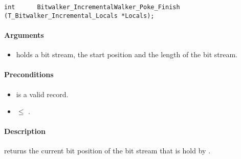 \begin{lstlisting}[style=acsl-block]
int		 Bitwalker_IncrementalWalker_Poke_Finish (T_Bitwalker_Incremental_Locals *Locals);
\end{lstlisting}

\paragraph{Arguments}
\begin{itemize}
    \item  {} holds a bit stream, the start position and the length of the bit stream.
\end{itemize}

\paragraph{Preconditions}
\begin{itemize}
    \item  {} is a valid record.
    \item {} $\leq $ .
\end{itemize}

\paragraph{Description}

\peekfinish  returns the current bit position of the bit stream that is hold by .


